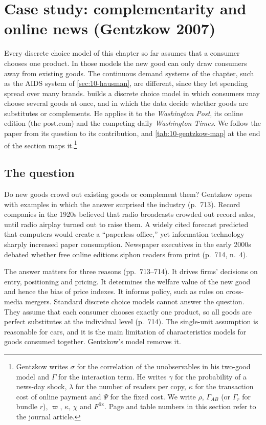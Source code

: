 \section{Case study: complementarity and online news (Gentzkow 2007)}\label{sec:10-gentzkow}

Every discrete choice model of this chapter so far assumes that a consumer chooses one product. In those models the
new good can only draw consumers away from existing goods. The continuous demand systems of the chapter, such as the
AIDS system of \cref{sec:10-hausman}, are different, since they let spending spread over many brands.
\citet{Gentzkow2007} builds a discrete choice model in which consumers may choose
several goods at once, and in which the data decide whether goods are substitutes or complements. He applies it to the
\textit{Washington Post}, its online edition (the post.com) and the competing daily \textit{Washington Times}. We follow
the paper from its question to its contribution, and \cref{tab:10-gentzkow-map} at the end of the section maps
it.\footnote{Gentzkow writes $\sigma$ for the correlation of the
unobservables in his two-good model and $\Gamma$ for the interaction term. He writes $\gamma$ for the probability of a
news-day shock, $\lambda$ for the number of readers per copy, $\kappa$ for the transaction cost of online payment and
$\Psi$ for the fixed cost. We write $\rho$, $\Gamma_{AB}$ (or $\Gamma_r$ for bundle $r$), $\varpi$, $\kappa$, $\chi$ and
$F^{\mathrm{fix}}$. Page and table numbers in this section refer to the journal article.}

\subsection{The question}\label{sec:10-gentzkow-question}

Do new goods crowd out existing goods or complement them? Gentzkow opens with examples in which the answer surprised
the industry (p.~713). Record companies in the 1920s believed that radio broadcasts crowded out record sales, until
radio airplay turned out to raise them. A widely cited forecast predicted that computers would create a ``paperless
office,'' yet information technology sharply increased paper consumption. Newspaper executives in the early 2000s
debated whether free online editions siphon readers from print (p.~714, n.~4).

The answer matters for three reasons (pp.~713--714). It drives firms' decisions on entry, positioning and pricing.
It determines the welfare value of the new good and hence the bias of price indexes. It informs policy, such as rules
on cross-media mergers. Standard discrete choice models cannot answer the question. They assume that each consumer
chooses exactly one product, so all goods are perfect substitutes at the individual level (p.~714). The single-unit
assumption is reasonable for cars, and it is the main limitation of characteristics models for goods consumed together.
Gentzkow's model removes it.

